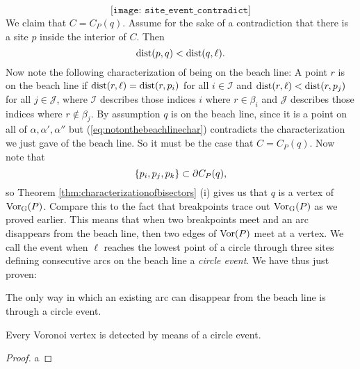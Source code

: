 \[
    \texttt{[image: site\_event\_contradict]} %
\]
We claim that $C = C_P(q)$. Assume for the sake of a contradiction that there is a site $p$ inside the interior of $C$. Then
\begin{equation} \label{eq:notonthebeachlinechar}
    \operatorname{dist}(p, q) < \operatorname{dist}(q, \ell).
\end{equation}
Now note the following characterization of being on the beach line: A point $r$ is on the beach line if $\operatorname{dist}(r, \ell) = \operatorname{dist}(r, p_i)$ for all $i \in \mathcal{I}$ and $\operatorname{dist}(r, \ell) < \operatorname{dist}(r, p_j)$ for all $j \in \mathcal{J}$, where $\mathcal{I}$ describes those indices $i$ where $r \in \beta_i$ and $\mathcal{J}$ describes those indices where $r \not\in \beta_j$. By assumption $q$ is on the beach line, since it is a point on all of $\alpha, \alpha', \alpha''$ but (\ref{eq:notonthebeachlinechar}) contradicts the characterization we just gave of the beach line. So it must be the case that $C = C_P(q)$. Now note that
\[
    \{p_i, p_j, p_k\} \subset \partial C_P(q),
\]
so Theorem \ref{thm:characterizationofbisectors} (i) gives us that $q$ is a vertex of $\operatorname{Vor_{G}}(P)$. Compare this to the fact that breakpoints trace out $\operatorname{Vor_{G}}(P)$ as we proved earlier. This means that when two breakpoints meet and an arc disappears from the beach line, then two edges of $\operatorname{Vor}(P)$ meet at a vertex. We call the event when $\ell$ reaches the lowest point of a circle through three sites defining consecutive arcs on the beach line a \emph{circle event}. We have thus just proven:
\begin{lem}
The only way in which an existing arc can disappear from the beach line is through a circle event.
\end{lem}


\begin{lem}
Every Voronoi vertex is detected by means of a circle event.
\end{lem}
\begin{proof}
a
\end{proof}